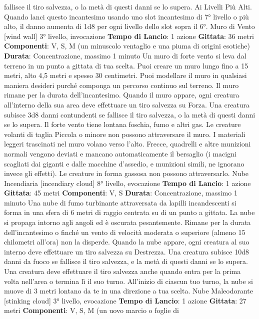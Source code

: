 \begin{multicols}{2}
fallisce il tiro salvezza, o la metà di questi danni se lo
supera.
Ai Livelli Più Alti. Quando lanci questo incantesimo
usando uno slot incantesimo di 7° livello o più alto, il
danno aumenta di 1d8 per ogni livello dello slot sopra il
6°.
Muro di Vento
[wind wall]
3° livello, invocazione
\textbf{Tempo di Lancio}: 1 azione
\textbf{Gittata}: 36 metri
\textbf{Componenti}: V, S, M (un minuscolo ventaglio e una
piuma di origini esotiche)
\textbf{Durata}: Concentrazione, massimo 1 minuto
Un muro di forte vento si leva dal terreno in un punto a
gittata di tua scelta. Puoi creare un muro lungo fino a 15
metri, alto 4,5 metri e spesso 30 centimetri. Puoi
modellare il muro in qualsiasi maniera desideri purché
componga un percorso continuo sul terreno. Il muro
rimane per la durata dell’incantesimo.
Quando il muro appare, ogni creatura all’interno della
sua area deve effettuare un tiro salvezza su Forza. Una
creatura subisce 3d8 danni contundenti se fallisce il tiro
salvezza, o la metà di questi danni se lo supera.
Il forte vento tiene lontana foschia, fumo e altri gas. Le
creature volanti di taglia Piccola o minore non possono
attraversare il muro. I materiali leggeri trascinati nel
muro volano verso l’alto. Frecce, quadrelli e altre
munizioni normali vengono deviati e mancano
automaticamente il bersaglio (i macigni scagliati dai
giganti e dalle macchine d’assedio, e munizioni simili,
ne ignorano invece gli effetti). Le creature in forma
gassosa non possono attraversarlo.
Nube Incendiaria
[incendiary cloud]
8° livello, evocazione
\textbf{Tempo di Lancio}: 1 azione
\textbf{Gittata}: 45 metri
\textbf{Componenti}: V, S
\textbf{Durata}: Concentrazione, massimo 1 minuto
Una nube di fumo turbinante attraversata da lapilli
incandescenti si forma in una sfera di 6 metri di raggio
centrata su di un punto a gittata. La nube si propaga
intorno agli angoli ed è oscurata pesantemente. Rimane
per la durata dell’incantesimo o finché un vento di
velocità moderata o superiore (almeno 15 chilometri
all’ora) non la disperde.
Quando la nube appare, ogni creatura al suo interno
deve effettuare un tiro salvezza su Destrezza. Una
creatura subisce 10d8 danni da fuoco se fallisce il tiro
salvezza, e la metà di questi danni se lo supera. Una
creatura deve effettuare il tiro salvezza anche quando
entra per la prima volta nell’area o termina lì il suo
turno.
All’inizio di ciascun tuo turno, la nube si muove di 3
metri lontano da te in una direzione a tua scelta.
Nube Maleodorante
[stinking cloud]
3° livello, evocazione
\textbf{Tempo di Lancio}: 1 azione
\textbf{Gittata}: 27 metri
\textbf{Componenti}: V, S, M (un uovo marcio o foglie di

\end{multicols}

